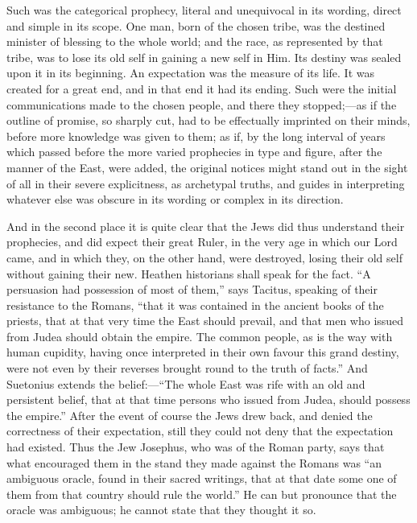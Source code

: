 Such was the categorical prophecy, literal and unequivocal in its
wording, direct and simple in its scope. One man, born of the chosen
tribe, was the destined minister of blessing to the whole world; and
the race, as represented by that tribe, was to lose its old self in
gaining a new self in Him. Its destiny was sealed upon it in its
beginning. An expectation was the measure of its life. It was created
for a great end, and in that end it had its ending. Such were the
initial communications made to the chosen people, and there they
stopped;—as if the outline of promise, so sharply cut, had to be
effectually imprinted on their minds, before more knowledge was given
to them; as if, by the long interval of years which passed before the
more varied prophecies in type and figure, after the manner of the
East, were added, the original notices might stand out in the sight of
all in their severe explicitness, as archetypal truths, and guides in
interpreting whatever else was obscure in its wording or complex in
its direction.

And in the second place it is quite clear that the Jews did thus
understand their prophecies, and did expect their great Ruler, in the
very age in which our Lord came, and in which they, on the other hand,
were destroyed, losing their old self without gaining their new.
Heathen historians shall speak for the fact. ``A persuasion had
possession of most of them,'' says Tacitus, speaking of their
resistance to the Romans, ``that it was contained in the ancient
books of the priests, that at that very time the East should prevail,
and that men who issued from Judea should obtain the empire. The
common people, as is the way with human cupidity, having once
interpreted in their own favour this grand destiny, were not even by
their reverses brought round to the truth of facts.'' And
Suetonius extends the belief:—``The whole East was rife with an
old and persistent belief, that at that time persons who issued from
Judea, should possess the empire.'' After the event of course the
Jews drew back, and denied the correctness of their expectation, still
they could not deny that the expectation had existed. Thus the Jew
Josephus, who was of the Roman party, says that what encouraged them
in the stand they made against the Romans was ``an ambiguous
oracle, found in their sacred writings, that at that date some one of
them from that country should rule the world.'' He can but
pronounce that the oracle was ambiguous; he cannot state that they
thought it so.

